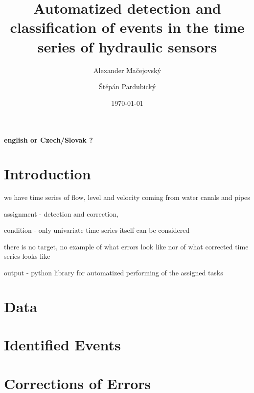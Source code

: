 \documentclass[12pt,a4paper]{article}
\title{Automatized detection and classification of events in the time series of hydraulic sensors}
\author{Alexander Ma\v{c}ejovsk\'{y} \and \v{S}t\v{e}p\'{a}n Pardubick\'{y}}
\date{\today}
\begin{document}

\maketitle %

\thispagestyle{empty} %

\clearpage %

\tableofcontents  

\newpage

\textbf{english or Czech/Slovak ?}

\section{Introduction}
we have time  series of flow, level and velocity coming from water canals and pipes

assignment - detection and correction, 

condition - only univariate time series itself can be considered

there is no target, no example of what errors look like nor of what corrected time series looks like

output - python library for automatized performing of the assigned tasks



\section{Data}




\section{Identified Events}




\section{Corrections of Errors}
\end{document}
